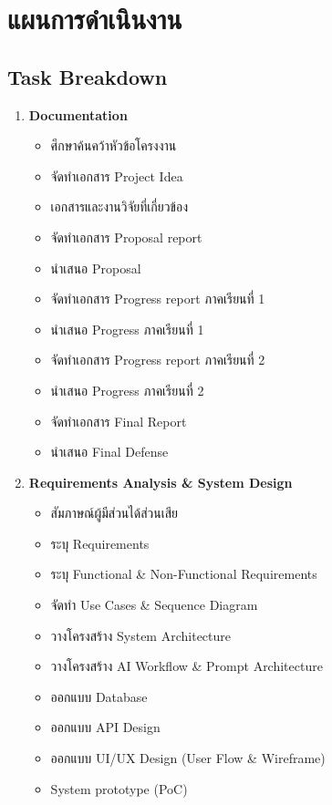 \section{แผนการดำเนินงาน}
\subsection{Task Breakdown}
\begin{enumerate}
  \item \textbf{Documentation}
    \begin{itemize}
      \item ศึกษาค้นคว้าหัวข้อโครงงาน
      \item จัดทำเอกสาร Project Idea
      \item เอกสารและงานวิจัยที่เกี่ยวข้อง
      \item จัดทำเอกสาร Proposal report
      \item นำเสนอ Proposal
      \item จัดทำเอกสาร Progress report ภาคเรียนที่ 1
      \item นำเสนอ Progress ภาคเรียนที่ 1
      \item จัดทำเอกสาร Progress report ภาคเรียนที่ 2
      \item นำเสนอ Progress ภาคเรียนที่ 2
      \item จัดทำเอกสาร Final Report
      \item นำเสนอ Final Defense
    \end{itemize}

  \item \textbf{Requirements Analysis \& System Design}
    \begin{itemize}
      \item สัมภาษณ์ผู้มีส่วนได้ส่วนเสีย
      \item ระบุ Requirements
      \item ระบุ Functional \& Non-Functional Requirements
      \item จัดทำ Use Cases \& Sequence Diagram
      \item วางโครงสร้าง System Architecture
      \item วางโครงสร้าง AI Workflow \& Prompt Architecture
      \item ออกแบบ Database
      \item ออกแบบ API Design
      \item ออกแบบ UI/UX Design (User Flow \& Wireframe)
      \item System prototype (PoC)
    \end{itemize}


\end{enumerate}

